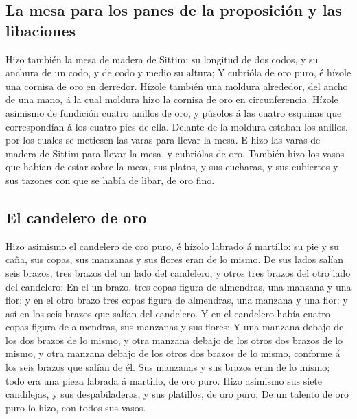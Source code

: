 \hypertarget{la-mesa-para-los-panes-de-la-proposiciuxf3n-y-las-libaciones}{%
\subsection{La mesa para los panes de la proposición y las
libaciones}\label{la-mesa-para-los-panes-de-la-proposiciuxf3n-y-las-libaciones}}

 Hizo también la mesa de madera de Sittim; su longitud de
dos codos, y su anchura de un codo, y de codo y medio su altura;
 Y cubrióla de oro puro, é hízole una cornisa de oro en
derredor.  Hízole también una moldura alrededor, del ancho
de una mano, á la cual moldura hizo la cornisa de oro en circunferencia.
 Hízole asimismo de fundición cuatro anillos de oro, y
púsolos á las cuatro esquinas que correspondían á los cuatro pies de
ella.  Delante de la moldura estaban los anillos, por los
cuales se metiesen las varas para llevar la mesa.  E hizo
las varas de madera de Sittim para llevar la mesa, y cubriólas de oro.
 También hizo los vasos que habían de estar sobre la mesa,
sus platos, y sus cucharas, y sus cubiertos y sus tazones con que se
había de libar, de oro fino.

\hypertarget{el-candelero-de-oro}{%
\subsection{El candelero de oro}\label{el-candelero-de-oro}}

 Hizo asimismo el candelero de oro puro, é hízolo labrado á
martillo: su pie y su caña, sus copas, sus manzanas y sus flores eran de
lo mismo.  De sus lados salían seis brazos; tres brazos del
un lado del candelero, y otros tres brazos del otro lado del candelero:
 En el un brazo, tres copas figura de almendras, una
manzana y una flor; y en el otro brazo tres copas figura de almendras,
una manzana y una flor: y así en los seis brazos que salían del
candelero.  Y en el candelero había cuatro copas figura de
almendras, sus manzanas y sus flores:  Y una manzana debajo
de los dos brazos de lo mismo, y otra manzana debajo de los otros dos
brazos de lo mismo, y otra manzana debajo de los otros dos brazos de lo
mismo, conforme á los seis brazos que salían de él.  Sus
manzanas y sus brazos eran de lo mismo; todo era una pieza labrada á
martillo, de oro puro.  Hizo asimismo sus siete candilejas,
y sus despabiladeras, y sus platillos, de oro puro;  De un
talento de oro puro lo hizo, con todos sus vasos.

